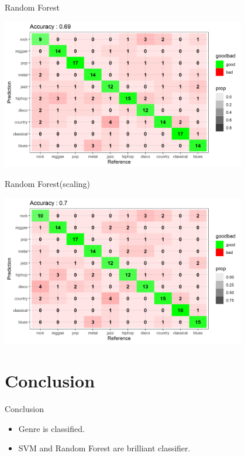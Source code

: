 \documentclass[11pt]{beamer}
\begin{document}
\begin{frame}{Random Forest}
\begin{center}
    \includegraphics[width=0.8\textwidth]{confusionMatrix_randomforest.png}
\end{center}
\end{frame}

\begin{frame}{Random Forest(scaling)}
\begin{center}
    \includegraphics[width=0.8\textwidth]{confusionMatrix_randomforest_std.png}
\end{center}
\end{frame}

\section{Conclusion}
\begin{frame}{Conclusion}
\begin{itemize}
    \item Genre is classified.
    \item SVM and Random Forest are brilliant classifier.
\end{itemize}
\end{frame}
\end{document}
